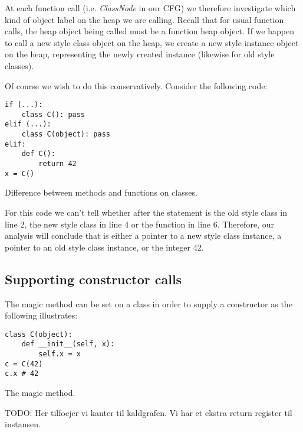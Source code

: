 At each function call (i.e. \textit{ClassNode} in our CFG) we therefore investigate which kind of object label on the heap we are calling. Recall that for usual function calls, the heap object being called must be a function heap object. If we happen to call a new style class object on the heap, we create a new style instance object on the heap, representing the newly created instance (likewise for old style classes).

Of course we wish to do this conservatively. Consider the following code:

\begin{listing}[H]
	\begin{verbatim}
if (...):
	class C(): pass
elif (...):
	class C(object): pass
elif:
	def C():
		return 42
x = C()
	\end{verbatim}
	\caption{Difference between methods and functions on classes.}\label{code:FieldAndMethodOnClass}
\end{listing}

For this code we can't tell whether  after the  statement is the old style class in line 2, the new style class in line 4 or the function in line 6. Therefore, our analysis will conclude that  is either a pointer to a new style class instance, a pointer to an old style class instance, or the integer 42.


\subsection{Supporting constructor calls}
The magic method  can be set on a class in order to supply a constructor as the following illustrates:

\begin{listing}[H]
	\begin{verbatim}
class C(object):
	def __init__(self, x):
		self.x = x
c = C(42)
c.x # 42
	\end{verbatim}
	\caption{The  magic method.}\label{code:InitConstructorClass}
\end{listing}

TODO: Her tilfoejer vi kanter til kaldgrafen. Vi har et ekstra return register til instansen.